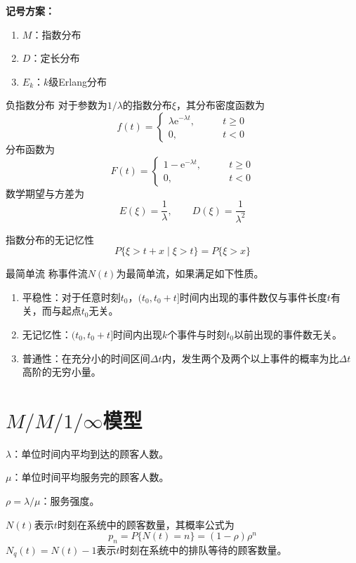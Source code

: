 \documentclass[lang = cn, scheme = chinese, thmcnt = section]{elegantbook}
\newcommand{\ee}[1]{\mathrm{e}^{#1}}
\begin{document}
\textbf{记号方案：}
\begin{enumerate}
	\item $M$：指数分布
	\item $D$：定长分布
	\item $E_k$：$k$级Erlang分布
\end{enumerate}

\begin{definition}{负指数分布}
	对于参数为$1/\lambda$的指数分布$\xi$，其分布密度函数为%
	$$
	f(t)=\begin{cases}
		\lambda\ee{-\lambda t},\qquad & t\ge 0\\
		0,\qquad & t<0
	\end{cases}
	$$
	分布函数为
	$$
	F(t)=\begin{cases}
		1-\ee{-\lambda t},\qquad & t\ge 0\\
		0,\qquad & t<0
	\end{cases}
	$$
	数学期望与方差为%
	$$
	E(\xi)=\frac{1}{\lambda},\qquad
	D(\xi)=\frac{1}{\lambda^2}
	$$
\end{definition}

\begin{theorem}{指数分布的无记忆性}
	$$
	P\{ \xi>t+x\mid \xi>t \}
	=P\{ \xi>x \}
	$$
\end{theorem}

\begin{definition}{最简单流}
	称事件流$N(t)$为最简单流，如果满足如下性质。
	\begin{enumerate}
		\item 平稳性：对于任意时刻$t_0$，$(t_0,t_0+t]$时间内出现的事件数仅与事件长度$t$有关，而与起点$t_0$无关。
		\item 无记忆性：$(t_0,t_0+t]$时间内出现$k$个事件与时刻$t_0$以前出现的事件数无关。
		\item 普通性：在充分小的时间区间$\Delta t$内，发生两个及两个以上事件的概率为比$\Delta t$高阶的无穷小量。
	\end{enumerate}
\end{definition}

\section{$M/M/1/\infty$模型}

$\lambda$：单位时间内平均到达的顾客人数。

$\mu$：单位时间平均服务完的顾客人数。

$\rho=\lambda/\mu$：服务强度。

$N(t)$表示$t$时刻在系统中的顾客数量，其概率公式为
$$
p_n
=P\{ N(t)=n \}
=(1-\rho)\rho^n
$$
$N_q(t)=N(t)-1$表示$t$时刻在系统中的排队等待的顾客数量。
\end{document}
